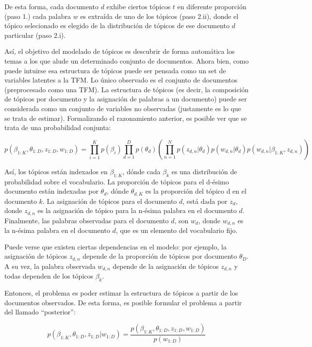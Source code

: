 \documentclass[]{article}
\begin{document}
De esta forma, cada documento \(d\) exhibe ciertos tópicos \(t\) en
diferente proporción (paso 1.) cada palabra \(w\) es extraída de uno de
los tópicos (paso 2.ii), donde el tópico selecionado es elegido de la
distribución de tópicos de ese documento \(d\) particular (paso 2.i).

Así, el objetivo del modelado de tópicos es descubrir de forma
automática los temas a los que alude un determinado conjunto de
documentos. Ahora bien, como puede intuirse esa estructura de tópicos
puede ser pensada como un set de variables latentes a la TFM. Lo único
observado es el conjunto de documentos (preprocesado como una TFM). La
estructura de tópicos (es decir, la composición de tópicos por documento
y la asignación de palabras a un documento) puede ser considerada como
un conjunto de variables no observadas (justamente es lo que se trata de
estimar). Formalizando el razonamiento anterior, es posible ver que se
trata de una probabilidad conjunta:

\[p(\beta_{1:K}, \theta_{1:D}, z_{1:D}, w_{1:D}) = \prod_{i=1}^K p(\beta_{i}) \prod_{d=1}^D p(\theta_{d}) (\prod_{n=1}^N p(z_{d,n}|\theta_{d}) p(w_{d,n}|\theta_{d}) p(w_{d,n}|\beta_{1:K}, z_{d,n}))\]

Así, los tópicos están indexados en \(\beta_{1:K}\), dónde cada
\(\beta_{k}\) es una distribución de probabilidad sobre el vocabulario.
La proporción de tópicos para el d-ésimo documento están indexadas por
\(\theta_{d}\), dónde \(\theta_{d,K}\) es la proporción del tópico d en
el documento \(k\). La asignación de tópicos para el documento \(d\),
está dada por \(z_{d}\), donde \(z_{d,n}\) es la asignación de tópico
para la n-ésima palabra en el documento \(d\). Finalmente, las palabras
observadas para el documento \(d\), son \(w_{d}\), donde \(w_{d,n}\) es
la n-ésima palabra en el documento \(d\), que es un elemento del
vocabulario fijo.

Puede verse que existen ciertas dependencias en el modelo: por ejemplo,
la asignación de tópicos \(z_{d,n}\) depende de la proporción de tópicos
por documento \(\theta_{D}\). A su vez, la palabra observada \(w_{d,n}\)
depende de la asignación de tópicos \(z_{d,n}\) y todas dependen de los
tópicos \(\beta_{k}\).

Entonces, el problema es poder estimar la estructura de tópicos a partir
de los documentos observados. De esta forma, es posible formular el
problema a partir del llamado ``posterior'':

\[p(\beta_{1:K}, \theta_{1:D}, z_{1:D} | w_{1:D}) = \frac{p(\beta_{1:K}, \theta_{1:D}, z_{1:D}, w_{1:D})}{p(w_{1:D})}
\]
\end{document}
